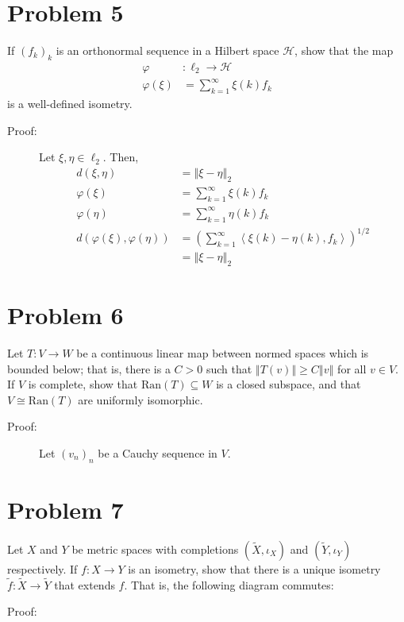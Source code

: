 \documentclass[10pt]{extarticle}
\newcommand{\iprod}[2]{\left\langle #1,#2\right\rangle}
\newcommand{\norm}[1]{\left\Vert #1\right\Vert}
\begin{document}
  \section{Problem 5}%
  If $(f_k)_k$ is an orthonormal sequence in a Hilbert space $\mathcal{H}$, show that the map
  \begin{align*}
    \varphi&: \ell_2 \rightarrow \mathcal{H}\\
    \varphi(\xi) &= \sum_{k=1}^{\infty}\xi(k)f_k
  \end{align*}
  is a well-defined isometry.
  \begin{description}
    \item[Proof:] Let $\xi,\eta\in \ell_2$. Then,
      \begin{align*}
        d(\xi,\eta) &= \norm{\xi-\eta}_2\\
        \varphi(\xi) &= \sum_{k=1}^{\infty}\xi(k)f_k\\
        \varphi(\eta) &= \sum_{k=1}^{\infty}\eta(k)f_k\\
        d(\varphi(\xi),\varphi(\eta)) &= \left(\sum_{k=1}^{\infty}\iprod{\xi(k)-\eta(k)}{f_k}\right)^{1/2}\\
                                      &=\norm{\xi - \eta}_2 \tag*{Parseval's Identity.}
      \end{align*}
  \end{description}
  \section{Problem 6}%
  Let $T: V\rightarrow W$ be a continuous linear map between normed spaces which is bounded below; that is, there is a $C > 0$ such that $\norm{T(v)} \geq C\norm{v}$ for all $v\in V$. If $V$ is complete, show that $\text{Ran}(T)\subseteq W$ is a closed subspace, and that $V\cong \text{Ran}(T)$ are uniformly isomorphic.
  \begin{description}
    \item[Proof:] Let $(v_n)_n$ be a Cauchy sequence in $V$. 
  \end{description}
  \section{Problem 7}%
  Let $X$ and $Y$ be metric spaces with completions $(\tilde{X},\iota_X)$ and $(\tilde{Y},\iota_Y)$ respectively. If $f: X\rightarrow Y$ is an isometry, show that there is a unique isometry $\tilde{f}: \tilde{X} \rightarrow \tilde{Y}$ that extends $f$. That is, the following diagram commutes:
  \begin{center}
  \end{center}
  \begin{description}
    \item[Proof:]
  \end{description}
\end{document}
